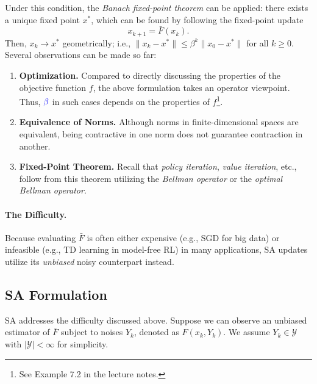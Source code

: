 \documentclass[11pt,twoside]{article}
\begin{document}
Under this condition, the \emph{Banach fixed-point theorem} can be applied: there exists a unique fixed point $x^*$, which can be found by following the fixed-point update 
\[
x_{k+1} = \bar{F}(x_k).
\]
Then, $x_k \to x^*$ geometrically; i.e., $\|x_k-x^*\| \leq \beta^k\|x_0-x^*\|$ for all $k \geq 0$. Several observations can be made so far:
\begin{enumerate}
    \item \textbf{Optimization.} Compared to directly discussing the properties of the objective function $f$, the above formulation takes an operator viewpoint. Thus, $\textcolor{blue}{\beta}$ in such cases depends on the properties of $f$\footnote{See Example 7.2 in the lecture notes.}.

    \item  \textbf{Equivalence of Norms.} Although norms in finite-dimensional spaces are equivalent, being contractive in one norm does not guarantee contraction in another.

    \item \textbf{Fixed-Point Theorem.} Recall that \emph{policy iteration}, \emph{value iteration}, etc., follow from this theorem utilizing the \emph{Bellman operator} or the \emph{optimal Bellman operator}.
\end{enumerate}

\paragraph{The Difficulty.} Because evaluating $\bar{F}$ is often either expensive (e.g., SGD for big data) or infeasible (e.g., TD learning in model-free RL) in many applications, SA updates utilize its \emph{unbiased} noisy counterpart instead. 
\clearpage
\subsection{SA Formulation}
SA addresses the difficulty discussed above. Suppose we can observe an unbiased estimator of $\bar F$ subject to noises $Y_k$, denoted as $F(x_k, Y_k)$. We assume $Y_k \in \mathcal{Y}$ with $|\mathcal{Y}| < \infty$ for simplicity.
\end{document}
